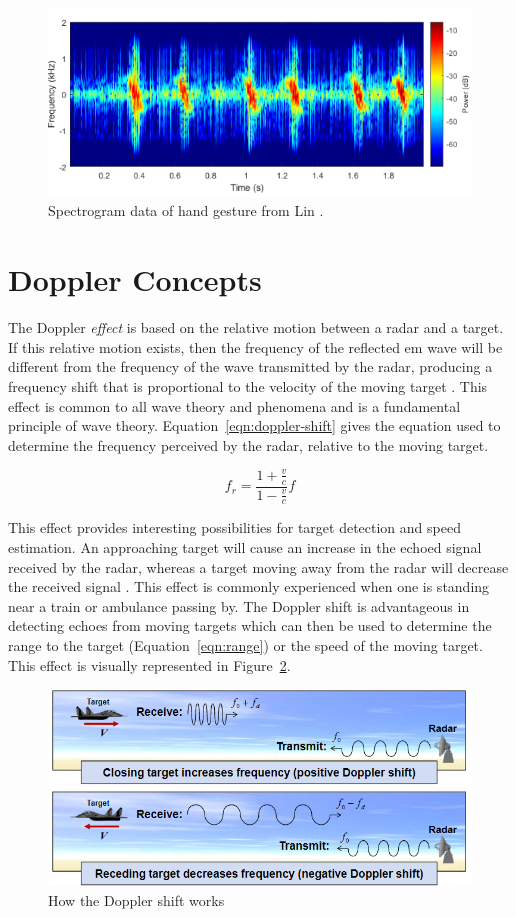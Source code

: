 \documentclass[class=report,11pt,crop=false]{standalone}
\begin{document}
\begin{figure}[htbp]
    \centering
    \includegraphics[width=0.6\columnwidth]{../Images/spectrogram_eg.png}
    \caption{Spectrogram data of hand gesture from Lin \cite{lin}.}
    \label{fig:spectrogram-eg}
\end{figure}

\section{Doppler Concepts}
The Doppler \emph{effect} is based on the relative motion between a radar and a target. If this relative motion exists, then the frequency of the reflected \gls{em} wave will be different from the frequency of the wave transmitted by the radar, producing a frequency shift that is proportional to the velocity of the moving target \cite{pomr, ian}. This effect is common to all wave theory and phenomena and is a fundamental principle of wave theory. Equation~\ref{eqn:doppler-shift} gives the equation used to determine the frequency perceived by the radar, relative to the moving target.

\begin{equation}
    f_r = \frac{1+\frac{v}{c}}{1-\frac{v}{c}}f
    \label{eqn:doppler-shift}
\end{equation}

This effect provides interesting possibilities for target detection and speed estimation. An approaching target will cause an increase in the echoed signal received by the \gls{radar}, whereas a target moving away from the \gls{radar} will decrease the received signal \cite{mitlecture2}. This effect is commonly experienced when one is standing near a train or ambulance passing by. The Doppler shift is advantageous in detecting echoes from moving targets which can then be used to determine the range to the target (Equation~\ref{eqn:range}) or the speed of the moving target. This effect is visually represented in Figure~\ref{fig:doppler-shift}.

\begin{figure}[htbp]
    \centering
    \includegraphics[width=0.6\columnwidth]{../Images/doppler_shift.png}
    \caption{How the Doppler shift works \cite{mitlecture2}}
    \label{fig:doppler-shift}
\end{figure}
\end{document}

